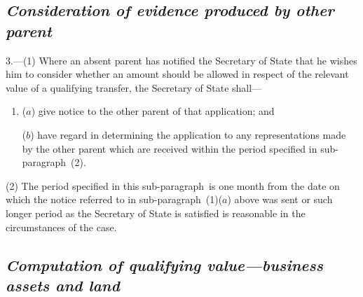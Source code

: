 \documentclass[12pt,a4paper]{article}
\begin{document}

\subsection*{\itshape Consideration of evidence produced by other parent}


3.—(1) Where an absent parent has notified the Secretary of State that he wishes him to consider whether an amount should be allowed in respect of the relevant value of a qualifying transfer, the Secretary of State shall—
\begin{enumerate}\item[]
($a$) give notice to the other parent of that application; and

($b$) have regard in determining the application to any representations made by the other parent which are received within the period specified in sub-paragraph~(2).
\end{enumerate}

(2) The period specified in this sub-paragraph~is one month from the date on which the notice referred to in sub-paragraph~(1)($a$) above was sent or such longer period as the Secretary of State is satisfied is reasonable in the circumstances of the case.


\subsection*{\itshape Computation of qualifying value—business assets and land}
\end{document}
